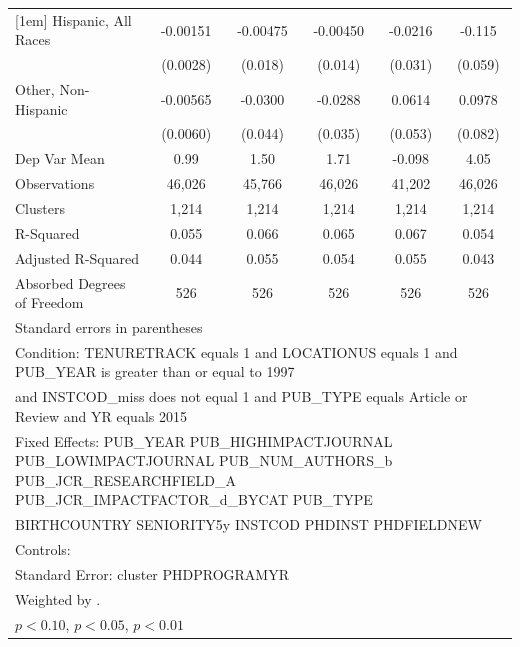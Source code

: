 \begin{table}[htbp]
\begin{tabular}{l*{5}{c}}
[1em]
Hispanic, All Races&    -0.00151         &    -0.00475         &    -0.00450         &     -0.0216         &      -0.115\sym{*}  \\
  &    (0.0028)         &     (0.018)         &     (0.014)         &     (0.031)         &     (0.059)         \\
[1em]
Other, Non-Hispanic&    -0.00565         &     -0.0300         &     -0.0288         &      0.0614         &      0.0978         \\
  &    (0.0060)         &     (0.044)         &     (0.035)         &     (0.053)         &     (0.082)         \\
\hline
Dep Var Mean&        0.99         &        1.50         &        1.71         &      -0.098         &        4.05         \\
Observations&      46,026         &      45,766         &      46,026         &      41,202         &      46,026         \\
Clusters&       1,214         &       1,214         &       1,214         &       1,214         &       1,214         \\
R-Squared&       0.055         &       0.066         &       0.065         &       0.067         &       0.054         \\
Adjusted R-Squared&       0.044         &       0.055         &       0.054         &       0.055         &       0.043         \\
Absorbed Degrees of Freedom&         526         &         526         &         526         &         526         &         526         \\
\hline\hline
\multicolumn{6}{l}{\footnotesize Standard errors in parentheses}\\
\multicolumn{6}{l}{\footnotesize Condition: TENURETRACK equals 1 and LOCATIONUS equals 1 and PUB\_YEAR is greater than or equal to 1997}\\
\multicolumn{6}{l}{\footnotesize and INSTCOD\_miss does not equal 1 and PUB\_TYPE equals Article or Review and YR equals 2015}\\
\multicolumn{6}{l}{\footnotesize Fixed Effects: PUB\_YEAR PUB\_HIGHIMPACTJOURNAL PUB\_LOWIMPACTJOURNAL PUB\_NUM\_AUTHORS\_b  PUB\_JCR\_RESEARCHFIELD\_A PUB\_JCR\_IMPACTFACTOR\_d\_BYCAT PUB\_TYPE}\\
\multicolumn{6}{l}{\footnotesize BIRTHCOUNTRY SENIORITY5y INSTCOD PHDINST PHDFIELDNEW}\\
\multicolumn{6}{l}{\footnotesize Controls: }\\
\multicolumn{6}{l}{\footnotesize Standard Error: cluster PHDPROGRAMYR}\\
\multicolumn{6}{l}{\footnotesize Weighted by .}\\
\multicolumn{6}{l}{\footnotesize \sym{*} \(p<0.10\), \sym{**} \(p<0.05\), \sym{***} \(p<0.01\)}\\
\end{tabular}
\end{table}
